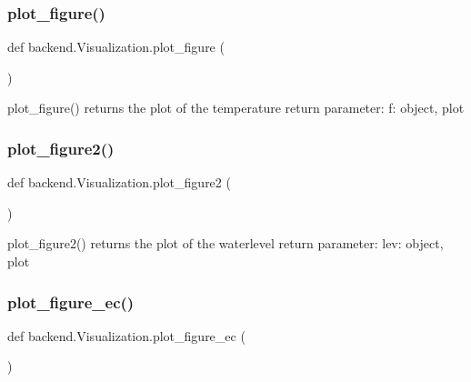 \subsubsection{\texorpdfstring{plot\+\_\+figure()}{plot\_figure()}}
{\footnotesize\ttfamily def backend.\+Visualization.\+plot\+\_\+figure (\begin{DoxyParamCaption}{ }\end{DoxyParamCaption})}

\begin{DoxyVerb}plot_figure() returns the plot of the temperature
return parameter:
    f: object, plot
\end{DoxyVerb}
 \mbox{\label{classbackend_1_1Visualization_a3f8d471ad9c547ce99d1cb6df2ead3ff_a3f8d471ad9c547ce99d1cb6df2ead3ff}} 
\subsubsection{\texorpdfstring{plot\+\_\+figure2()}{plot\_figure2()}}
{\footnotesize\ttfamily def backend.\+Visualization.\+plot\+\_\+figure2 (\begin{DoxyParamCaption}{ }\end{DoxyParamCaption})}

\begin{DoxyVerb}plot_figure2() returns the plot of the waterlevel
return parameter:
    lev: object, plot
\end{DoxyVerb}
 \mbox{\label{classbackend_1_1Visualization_aa77270cd5c2d85be88281a0a2a51e965_aa77270cd5c2d85be88281a0a2a51e965}} 
\subsubsection{\texorpdfstring{plot\+\_\+figure\+\_\+ec()}{plot\_figure\_ec()}}
{\footnotesize\ttfamily def backend.\+Visualization.\+plot\+\_\+figure\+\_\+ec (\begin{DoxyParamCaption}{ }\end{DoxyParamCaption})}

